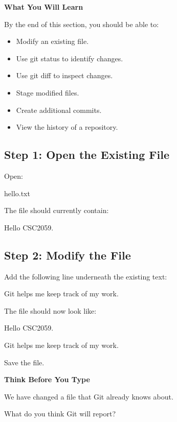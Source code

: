\documentclass{csc2059practical}
\begin{document}
\begin{learningoutcomes}
\textbf{What You Will Learn}\par
\medskip
By the end of this section, you should be able to:

\begin{itemize}
  \item Modify an existing file.
  \item Use git status to identify changes.
  \item Use git diff to inspect changes.
  \item Stage modified files.
  \item Create additional commits.
  \item View the history of a repository.
\end{itemize}
\end{learningoutcomes}
\subsection{Step 1: Open the Existing File}
Open:

\begin{terminalplain}
hello.txt
\end{terminalplain}
The file should currently contain:

\begin{terminalplain}
Hello CSC2059.
\end{terminalplain}
\subsection{Step 2: Modify the File}
Add the following line underneath the existing text:

Git helps me keep track of my work.

The file should now look like:

\begin{terminalplain}
Hello CSC2059.
\end{terminalplain}
Git helps me keep track of my work.

Save the file.

\begin{reflectionbox}
\textbf{Think Before You Type}\par
\medskip

We have changed a file that Git already knows about.


What do you think Git will report?


\end{reflectionbox}
\end{document}
